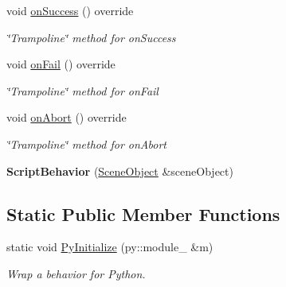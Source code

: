 \begin{DoxyCompactItemize}
void \mbox{\hyperlink{classrev_1_1_py_script_behavior_a08045cf57811ffe042d5654048127d74}{on\+Success}} () override
\begin{DoxyCompactList}\small\item\em \char`\"{}\+Trampoline\char`\"{} method for on\+Success \end{DoxyCompactList}\item 
\mbox{\label{classrev_1_1_py_script_behavior_a82aa7ca2470a4f11105008b80dff649a}} 
void \mbox{\hyperlink{classrev_1_1_py_script_behavior_a82aa7ca2470a4f11105008b80dff649a}{on\+Fail}} () override
\begin{DoxyCompactList}\small\item\em \char`\"{}\+Trampoline\char`\"{} method for on\+Fail \end{DoxyCompactList}\item 
\mbox{\label{classrev_1_1_py_script_behavior_a2c14340b71fab3b74ff18dc3892d43a8}} 
void \mbox{\hyperlink{classrev_1_1_py_script_behavior_a2c14340b71fab3b74ff18dc3892d43a8}{on\+Abort}} () override
\begin{DoxyCompactList}\small\item\em \char`\"{}\+Trampoline\char`\"{} method for on\+Abort \end{DoxyCompactList}\item 
\mbox{\label{classrev_1_1_py_script_behavior_ad96d293305ea21964fea2ba3b46298d0}} 
{\bfseries Script\+Behavior} (\mbox{\hyperlink{classrev_1_1_scene_object}{Scene\+Object}} \&scene\+Object)
\end{DoxyCompactItemize}
\subsection*{Static Public Member Functions}
\begin{DoxyCompactItemize}
\item 
\mbox{\label{classrev_1_1_py_script_behavior_aa308ea30ad8a3e884398e8e4da15eb6d}} 
static void \mbox{\hyperlink{classrev_1_1_py_script_behavior_aa308ea30ad8a3e884398e8e4da15eb6d}{Py\+Initialize}} (py\+::module\+\_\+ \&m)
\begin{DoxyCompactList}\small\item\em Wrap a behavior for Python. \end{DoxyCompactList}\end{DoxyCompactItemize}


